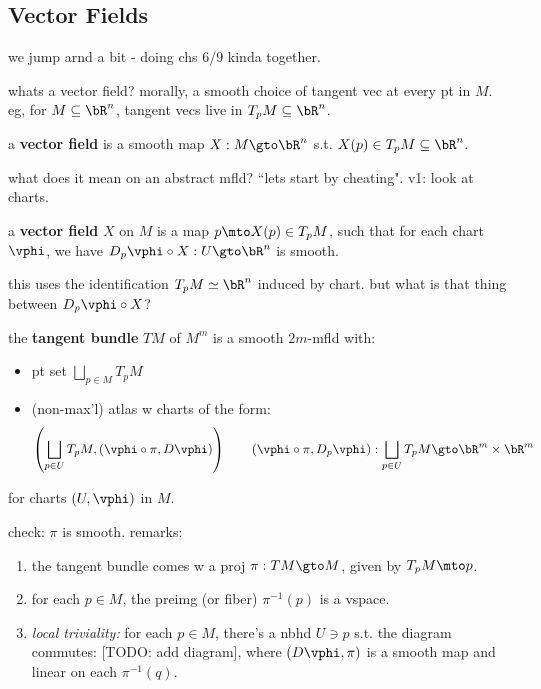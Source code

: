 \subsection{Vector Fields}
we jump arnd a bit - doing chs 6/9 kinda together.

whats a vector field? morally, a smooth choice of tangent vec at every pt in $M$.
eg, for $M\subseteq\bR^{n}$, tangent vecs live in $T_{p}M\subseteq\bR^{n}$.

\begin{defn}
	a \textbf{vector field} is a smooth map $X:M\gto\bR^{n}$ s.t.
	$X(p)\in T_{p}M\subseteq\bR^{n}$.
\end{defn}
what does it mean on an abstract mfld? ``lets start by cheating".
v1: look at charts.

\begin{defn}
	a \textbf{vector field} $X$ on $M$ is a map $p\mto X(p)\in T_{p}M$, such that
	for each chart $\vphi$, we have $D_{p}\vphi\circ X:U\gto\bR^{n}$ is smooth.
\end{defn}
this uses the identification $T_{p}M\simeq\bR^{n}$ induced by chart.
but what is that thing between $D_{p}\vphi\circ X$?

\begin{defn}
	the \textbf{tangent bundle} $TM$ of $M^{m}$ is a smooth $2m$-mfld with:
	\begin{itemize}
		\item pt set $\bigsqcup_{p\in M}T_{p}M$
		\item (non-max'l) atlas w charts of the form:
			\begin{equation*}
				\left(\bigsqcup_{p\in U}T_{p}M,(\vphi\circ\pi,D\vphi)\right) \qquad
				(\vphi\circ\pi,D_{p}\vphi):\bigsqcup_{p\in U}T_{p}M\gto\bR^{m}\times\bR^{m}
			\end{equation*}
	\end{itemize}
	for charts $(U,\vphi)$ in $M$.
\end{defn}
check: $\pi$ is smooth. remarks:
\begin{enumerate}[(1)]
	\item the tangent bundle comes w a proj $\pi:TM\gto M$, given by $T_{p}M\mto p$.
	\item for each $p\in M$, the preimg (or fiber) $\pi^{-1}(p)$ is a vspace.
	\item \textit{local triviality:} for each $p\in M$, there's a nbhd $U\ni p$ s.t. the diagram commutes:
		[TODO: add diagram], where $(D\vphi,\pi)$ is a smooth map and
		linear on each $\pi^{-1}(q)$.
\end{enumerate}


